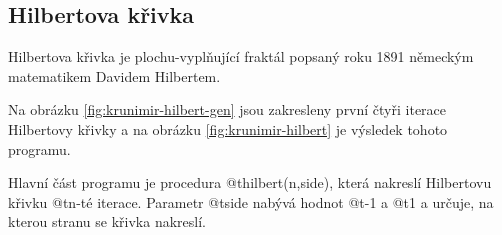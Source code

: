 \subsection{Hilbertova křivka}

Hilbertova křivka je plochu-vyplňující fraktál popsaný roku 1891 německým
matematikem Davidem Hilbertem. \cite{wiki:hilbert-curve}

Na obrázku \ref{fig:krunimir-hilbert-gen} jsou zakresleny první čtyři iterace
Hilbertovy křivky a na obrázku \ref{fig:krunimir-hilbert} je výsledek tohoto
programu.

Hlavní část programu je procedura @t{hilbert(n,side)}, která nakreslí Hilbertovu
křivku @t{n}-té iterace. Parametr @t{side} nabývá hodnot @t{-1} a @t{1} a
určuje, na kterou stranu se křivka nakreslí.



